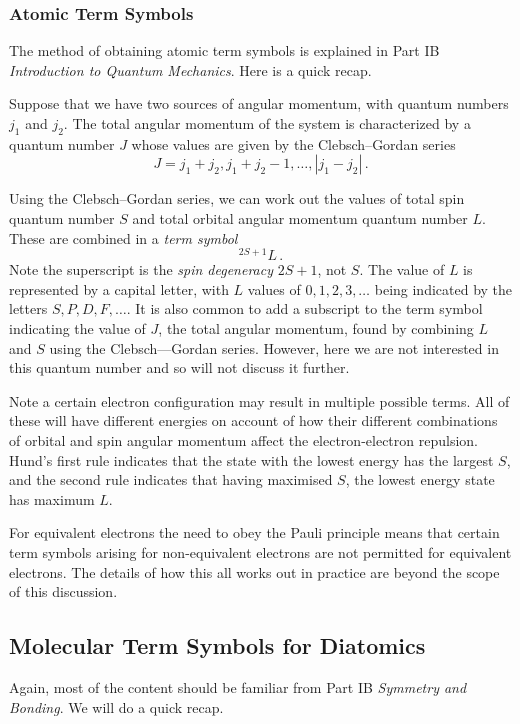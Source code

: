 \documentclass{article}
\theoremstyle{plain}\theoremheaderfont{\normalfont\itshape}\theorembodyfont{\rmfamily}\theoremseparator{.}\newtheorem*{rem}{Remark}\newtheorem*{ex}{Example}\newtheorem*{proof}{Proof}\newtheorem*{altp}{Alternative proof}
\theoremstyle{plain}\theoremheaderfont{\normalfont\bfseries}\theorembodyfont{\rmfamily}\theoremseparator{.}\newtheorem{thm}{Theorem}[section]\newtheorem{lem}[thm]{Lemma}\newtheorem{prop}[thm]{Proposition}\newtheorem*{cor}{Corollary}\newtheorem{defn}[thm]{Definition}\newtheorem{clm}[thm]{Claim}\newtheorem{clminproof}{Claim}\newtheorem{pos}{Postulate}[section]
\theoremstyle{break}\theoremheaderfont{\normalfont\itshape}\theorembodyfont{\rmfamily}\theoremseparator{.\medskip}\newtheorem*{proofskip}{Proof}\newtheorem*{exs}{Examples}\newtheorem*{rems}{Remarks}
\theoremstyle{break}\theoremheaderfont{\normalfont\bfseries}\theorembodyfont{\rmfamily}\theoremseparator{.\medskip}\newtheorem{lemskip}[thm]{Lemma}\newtheorem{defnskip}[thm]{Definition}\newtheorem{propskip}[thm]{Proposition}\newtheorem{thmskip}[thm]{Theorem}
\numberwithin{equation}{section}
\newcommand{\abs}[1]{\left| #1 \right|}
\begin{document}
    \subsubsection{Atomic Term Symbols}
    The method of obtaining atomic term symbols is explained in Part IB \textit{Introduction to Quantum Mechanics}. Here is a quick recap.

    Suppose that we have two sources of angular momentum, with quantum numbers \(j_1\) and \(j_2\). The total angular momentum of the system is  characterized by a quantum number \(J\) whose values are given by the Clebsch--Gordan series
    \begin{equation}
        J=j_1+j_2,j_1+j_2-1,\dots,\abs{j_1-j_2}\,.
    \end{equation}

    Using the Clebsch--Gordan series, we can work out the values of total spin quantum number \(S\) and total orbital angular momentum quantum number \(L\). These are combined in a \textit{term symbol}
    \begin{equation}
        ^{2S+1}L\,.
    \end{equation}
    Note the superscript is the \textit{spin degeneracy} \(2S+1\), not \(S\). The value of \(L\) is represented by a capital letter, with \(L\) values of \(0,1,2,3,\dots\) being indicated by the letters \(S,P,D,F,\dots\). It is also common to add a subscript to the term symbol indicating the value of \(J\), the total angular momentum, found by combining \(L\) and \(S\) using the Clebsch---Gordan series. However, here we are not interested in this quantum number and so will not discuss it further.

    Note a certain electron configuration may result in multiple possible terms. All of these will have different energies on account of how their different combinations of orbital and spin angular momentum affect the electron-electron repulsion. Hund's first rule indicates that the state with the lowest energy has the largest \(S\), and the second rule indicates that having maximised \(S\), the lowest energy state has maximum \(L\).

    For equivalent electrons the need to obey the Pauli principle means that certain term symbols arising for non-equivalent electrons are not permitted for equivalent electrons. The details of how this all works out in practice are beyond the scope of this discussion.

    \subsection{Molecular Term Symbols for Diatomics}
    Again, most of the content should be familiar from Part IB \textit{Symmetry and Bonding}. We will do a quick recap.
\end{document}
